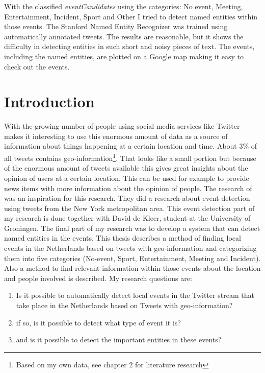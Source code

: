 \documentclass[
10pt, %
a4paper, %
oneside, %
headinclude,footinclude, %
BCOR5mm, %
]{scrartcl}
\begin{document}
\vl
With the classified \textit{eventCandidates} using the categories: No event, Meeting, Entertainment, Incident, Sport and Other I tried to detect named entities within those events. The Stanford Named Entity Recognizer was trained using automatically annotated tweets. The results are reasonable, but it shows the difficulty in detecting entities in such short and noisy pieces of text.
\vl
The events, including the named entities, are plotted on a Google map making it easy to check out the events.


\newpage %


\section{Introduction}

With the growing number of people using social media services like Twitter makes it interesting to use this enormous amount of data as a source of information about things happening at a certain location and time. 
\vl
About 3\% of all tweets contains geo-information\footnote{Based on my own data, see chapter 2 for literature research}. That looks like a small portion but because of the enormous amount of tweets available this gives great insights about the opinion of users at a certain location. This can be used for example to provide news items with more information about the opinion of people. The research of \citeauthor{walther2013geo} was an inspiration for this research. They did a research about event detection using tweets from the New York metropolitan area.
\vl
This event detection part of my research is done together with David de Kleer, student at the University of Groningen. The final part of my research was to develop a system that can detect named entities in the events. 
\vl
This thesis describes a method of finding local events in the Netherlands based on tweets with geo-information and categorizing them into five categories (No-event, Sport, Entertainment, Meeting and Incident). Also a method to find relevant information within those events about the location and people involved is described. 
\vl
My research questions are:
\begin{enumerate}[noitemsep]
\item Is it possible to automatically detect local events in the Twitter stream that take place in the Netherlands based on Tweets with geo-information?
\item if so, is it possible to detect what type of event it is?
\item and is it possible to detect the important entities in these events?
\end{enumerate}
\end{document}
